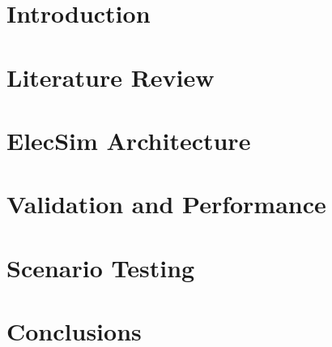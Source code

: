 \documentclass[sigconf]{acmart}
\begin{document}


%


%

%
\maketitle


\section{Introduction}


\section{Literature Review}\label{Literature Review}

\section{ElecSim Architecture} \label{Model}



\section{Validation and Performance}\label{Validation and Performance}



\section{Scenario Testing}\label{Scenario Testing}




\section{Conclusions}\label{Conclusion}

\end{document}
